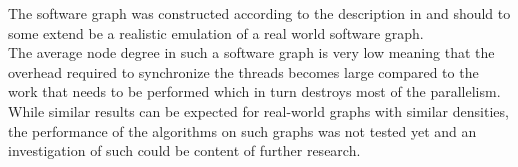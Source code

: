 %
The software graph was constructed according to the description in \cite{musco2014generative} and should to some extend be a realistic emulation of a real world software graph. \\
The average node degree in such a software graph is very low meaning that the overhead required to synchronize the threads becomes large compared to the work that needs to be performed which in turn destroys most of the parallelism. \\
%
While similar results can be expected for real-world graphs with similar densities, the performance of the algorithms on such graphs was not tested yet and an investigation of such could be content of further research.
